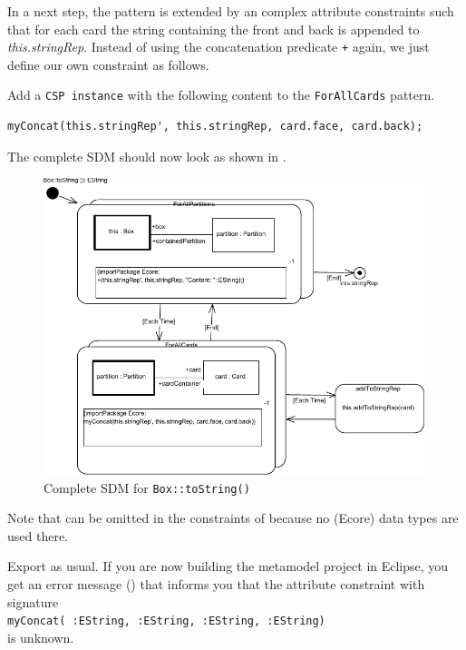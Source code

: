 In a next step, the pattern  is extended by an complex attribute constraints such that for each card the string containing the front and back is appended to \emph{this.stringRep}.  	 
Instead of using the concatenation predicate \texttt{+} again, we just define our own constraint as follows.
\begin{stepbystep}
\item 
Add a \texttt{CSP instance} with the following content to the \texttt{ForAllCards} pattern.
\begin{verbatim}
myConcat(this.stringRep', this.stringRep, card.face, card.back);
\end{verbatim}
The complete SDM should now look as shown in .
%
\begin{figure}[htbp]
\begin{center}
  \includegraphics[width=0.99\textwidth]{../../org.moflon.doc.handbook.03_storyDiagrams/13_complexAttributeConstraints/visCACImages/ea_CAC_CompletToString.pdf}
  \caption{Complete SDM for \texttt{Box::toString()}}  
  \label{ea_CAC_CompletToString}
\end{center}
\end{figure}
%
Note that  can be omitted in the constraints of  because no (Ecore) data types are used there.
%
\item
Export as usual.
If you are now building the metamodel project in Eclipse, you get an error message () that informs you that the attribute constraint with signature \\
\hspace*{0.5cm} \texttt{\small myConcat( :EString, :EString, :EString, :EString)} \\
is unknown.


\end{stepbystep}
